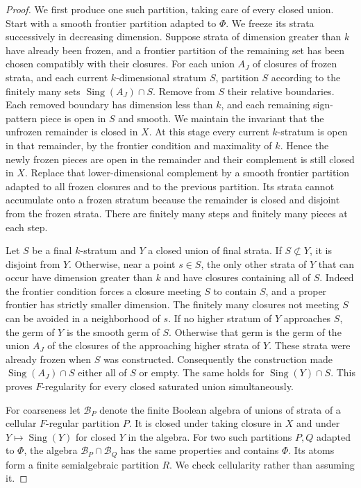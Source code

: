 \begin{proof}
We first produce one such partition, taking care of every closed union.
Start with a smooth frontier partition adapted to $\Phi$. We freeze its
strata successively in decreasing dimension. Suppose strata of dimension
greater than $k$ have already been frozen, and a frontier partition of
the remaining set has been chosen compatibly with their closures. For
each union $A_J$ of closures of frozen strata, and each current
$k$-dimensional stratum $S$, partition $S$ according to the finitely many
sets $\operatorname{Sing}(A_J)\cap S$. Remove from $S$ their relative
boundaries. Each removed boundary has dimension less than $k$, and each
remaining sign-pattern piece is open in $S$ and smooth. We maintain the
invariant that the unfrozen remainder is closed in $X$. At this stage
every current $k$-stratum is open in that remainder, by the frontier
condition and maximality of $k$. Hence the newly frozen pieces are open
in the remainder and their complement is still closed in $X$. Replace
that lower-dimensional complement by a smooth frontier partition adapted
to all frozen closures and to the previous partition. Its strata cannot
accumulate onto a frozen stratum because the remainder is closed and
disjoint from the frozen strata. There are finitely many
steps and finitely many pieces at each step.

Let $S$ be a final $k$-stratum and $Y$ a closed union of final strata.
If $S\not\subset Y$, it is disjoint from $Y$. Otherwise, near a point
$s\in S$, the only other strata of $Y$ that can occur have dimension
greater than $k$ and have closures containing all of $S$. Indeed the
frontier condition forces a closure meeting $S$ to contain $S$, and a
proper frontier has strictly smaller dimension. The finitely many
closures not meeting $S$ can be avoided in a neighborhood of $s$.
If no higher stratum of $Y$ approaches $S$, the germ of $Y$ is the smooth
germ of $S$. Otherwise that germ is the germ of the union $A_J$ of the
closures of the approaching higher strata of $Y$. These strata were
already frozen when $S$ was constructed. Consequently the construction
made $\operatorname{Sing}(A_J)\cap S$ either all of $S$ or empty.
The same holds for $\operatorname{Sing}(Y)\cap S$. This proves
$F$-regularity for every closed saturated union simultaneously.

For coarseness let $\mathcal B_P$ denote the finite Boolean algebra of
unions of strata of a cellular $F$-regular partition $P$. It is closed
under taking closure in $X$ and under $Y\mapsto\operatorname{Sing}(Y)$
for closed $Y$ in the algebra. For two such partitions $P,Q$ adapted to
$\Phi$, the algebra $\mathcal B_P\cap\mathcal B_Q$ has the same
properties and contains $\Phi$. Its atoms form a finite semialgebraic
partition $R$. We check cellularity rather than assuming it.


\end{proof}
